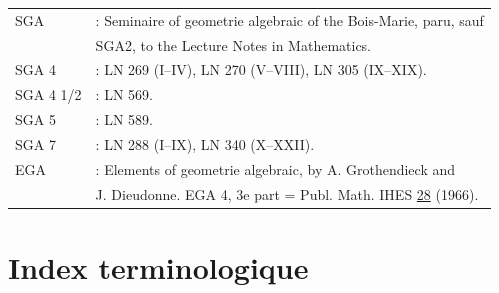 \documentclass[12pt,a4paper]{article}
\theoremstyle{plain}
\theoremstyle{definition}
\theoremstyle{remark}
\begin{document}
\begin{tabular}{ll}
SGA &: Seminaire of geometrie algebraic of the Bois-Marie, paru, sauf \\ & \quad SGA2, to the Lecture Notes in Mathematics. \\[6pt]
SGA 4 &: LN 269 (I--IV), LN 270 (V--VIII), LN 305 (IX--XIX). \\[6pt]
SGA 4 1/2 &: LN 569. \\[6pt]
SGA 5 &: LN 589. \\[6pt]
SGA 7 &: LN 288 (I--IX), LN 340 (X--XXII). \\[12pt]
EGA &: Elements of geometrie algebraic, by A. Grothendieck and \\ & \quad J. Dieudonne. EGA 4, 3e part = Publ. Math. IHES \underline{28} (1966).
\end{tabular}

\newpage
\section*{Index terminologique}
\end{document}
